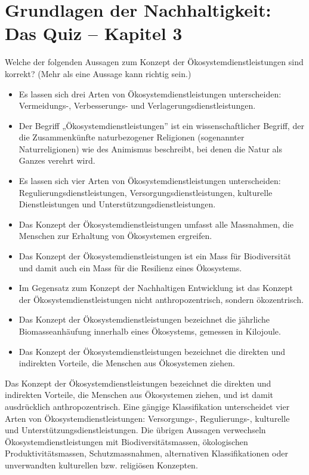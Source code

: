 \documentclass[
  nswissgerman,
  a4paper,
  DIV=11,
  numbers=noendperiod,
  oneside,
  openany]{scrreprt}
\providecommand{\tightlist}{%
  \setlength{\itemsep}{0pt}\setlength{\parskip}{0pt}}
\begin{document}
\section{Grundlagen der Nachhaltigkeit: Das Quiz -- Kapitel
3}\label{grundlagen-der-nachhaltigkeit-das-quiz-kapitel-3}

Welche der folgenden Aussagen zum Konzept der Ökosystemdienstleistungen
sind korrekt? (Mehr als eine Aussage kann richtig sein.)

\begin{itemize}
\tightlist
\item[$\square$]
  Es lassen sich drei Arten von Ökosystemdienstleistungen unterscheiden:
  Vermeidungs-, Verbesserungs- und Verlagerungsdienstleistungen.
\item[$\square$]
  Der Begriff „Ökosystemdienstleistungen'' ist ein wissenschaftlicher
  Begriff, der die Zusammenkünfte naturbezogener Religionen (sogenannter
  Naturreligionen) wie des Animismus beschreibt, bei denen die Natur als
  Ganzes verehrt wird.
\item[$\square$]
  Es lassen sich vier Arten von Ökosystemdienstleistungen unterscheiden:
  Regulierungsdienstleistungen, Versorgungsdienstleistungen, kulturelle
  Dienstleistungen und Unterstützungsdienstleistungen.
\item[$\square$]
  Das Konzept der Ökosystemdienstleistungen umfasst alle Massnahmen, die
  Menschen zur Erhaltung von Ökosystemen ergreifen.
\item[$\square$]
  Das Konzept der Ökosystemdienstleistungen ist ein Mass für
  Biodiversität und damit auch ein Mass für die Resilienz eines
  Ökosystems.
\item[$\square$]
  Im Gegensatz zum Konzept der Nachhaltigen Entwicklung ist das Konzept
  der Ökosystemdienstleistungen nicht anthropozentrisch, sondern
  ökozentrisch.
\item[$\square$]
  Das Konzept der Ökosystemdienstleistungen bezeichnet die jährliche
  Biomasseanhäufung innerhalb eines Ökosystems, gemessen in Kilojoule.
\item[$\square$]
  Das Konzept der Ökosystemdienstleistungen bezeichnet die direkten und
  indirekten Vorteile, die Menschen aus Ökosystemen ziehen.
\end{itemize}

Das Konzept der Ökosystemdienstleistungen bezeichnet die direkten und
indirekten Vorteile, die Menschen aus Ökosystemen ziehen, und ist damit
ausdrücklich anthropozentrisch. Eine gängige Klassifikation
unterscheidet vier Arten von Ökosystemdienstleistungen: Versorgungs-,
Regulierungs-, kulturelle und Unterstützungsdienstleistungen. Die
übrigen Aussagen verwechseln Ökosystemdienstleistungen mit
Biodiversitätsmassen, ökologischen Produktivitätsmassen,
Schutzmassnahmen, alternativen Klassifikationen oder unverwandten
kulturellen bzw. religiösen Konzepten.
\end{document}
